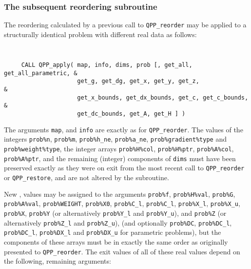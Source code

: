 \documentclass{galahad}
\newcommand{\packagename}{QPP}
\begin{document}

\subsubsection{The subsequent reordering subroutine}
The reordering calculated by a previous call to {\tt \packagename\_reorder} 
may be applied to a structurally identical problem with different real data 
as follows:

\vspace*{-2mm}
{\tt 
\begin{verbatim}
     CALL QPP_apply( map, info, dims, prob [, get_all, get_all_parametric, &
                     get_g, get_dg, get_x, get_y, get_z,                   &
                     get_x_bounds, get_dx_bounds, get_c, get_c_bounds,     &
                     get_dc_bounds, get_A, get_H ] )
\end{verbatim}
}
\vspace*{-1mm}
\noindent
The arguments {\tt map}, and {\tt info} are exactly as for 
{\tt \packagename\_reorder}. The values of the integers 
{\tt prob\%n}, {\tt prob\%m}, {\tt prob\%h\_ne}, {\tt prob\%a\_ne},
{\tt prob\%gradient\%type} and {\tt prob\%weight\%type}, the
integer arrays {\tt prob\%H\%col}, {\tt prob\%H\%ptr}, 
{\tt prob\%A\%col}, {\tt prob\%A\%ptr}, and the remaining (integer) 
components of {\tt dims} must 
have been preserved exactly as they were on exit from the most recent 
call to {\tt \packagename\_reorder} or {\tt \packagename\_restore}, 
and are not altered by the subroutine. 

New \realdp, values may be assigned to the arguments 
{\tt prob\%f}, {\tt prob\%H\%val}, {\tt prob\%G}, {\tt prob\%A\%val}, 
{\tt prob\%WEIGHT}, {\tt prob\%X0}, {\tt prob\%C\_l}, 
{\tt prob\%C\_l}, {\tt prob\%X\_l}, {\tt prob\%X\_u}, {\tt prob\%X}, 
{\tt prob\%Y} 
(or alternatively {\tt prob\%Y\_l} and {\tt prob\%Y\_u}), 
and {\tt prob\%Z}
(or alternatively {\tt prob\%Z\_l} and {\tt prob\%Z\_u}), 
(and optionally 
{\tt prob\%DC}, {\tt prob\%DC\_l}, {\tt prob\%DC\_l}, {\tt prob\%DX\_l} and 
{\tt prob\%DX\_u} for parametric problems), 
but the components of these arrays 
must be in exactly the same order as originally presented to 
{\tt \packagename\_reorder}. 
The exit values of all of these real values depend on the following, 
remaining arguments: 
\end{document}
